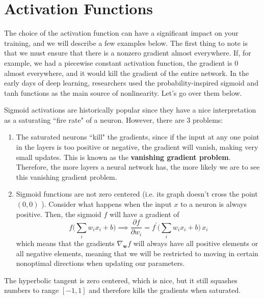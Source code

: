 \section{Activation Functions} 

  The choice of the activation function can have a significant impact on your training, and we will describe a few examples below. The first thing to note is that we must ensure that there is a nonzero gradient almost everywhere. If, for example, we had a piecewise constant activation function, the gradient is $0$ almost everywhere, and it would kill the gradient of the entire network. In the early days of deep learning, researchers used the probability-inspired sigmoid and tanh functions as the main source of nonlinearity. Let's go over them below. 

  \begin{definition}[Sigmoid]
    Sigmoid activations are historically popular since they have a nice interpretation as a saturating ``fire rate" of a neuron. However, there are 3 problems: 
    \begin{enumerate}
      \item The saturated neurons ``kill" the gradients, since if the input at any one point in the layers is too positive or negative, the gradient will vanish, making very small updates. This is known as the \textbf{vanishing gradient problem}. Therefore, the more layers a neural network has, the more likely we are to see this vanishing gradient problem. 
      \item Sigmoid functions are not zero centered (i.e. its graph doesn't cross the point $(0, 0)$ ). Consider what happens when the input $x$ to a neuron is always positive. Then, the sigmoid $f$ will have a gradient of 
      \begin{equation}
        f \bigg( \sum_i w_i x_i + b \bigg) \implies \frac{\partial f}{\partial w_i} = f^\prime \bigg( \sum_i w_i x_i + b \bigg)\, x_i
      \end{equation}
      which means that the gradients $\nabla_\mathbf{w} f$ will always have all positive elements or all negative elements, meaning that we will be restricted to moving in certain nonoptimal directions when updating our parameters. 
    \end{enumerate}
  \end{definition} 

  \begin{definition}
    The hyperbolic tangent is zero centered, which is nice, but it still squashes numbers to range $[-1, 1]$ and therefore kills the gradients when saturated. 
  \end{definition}

